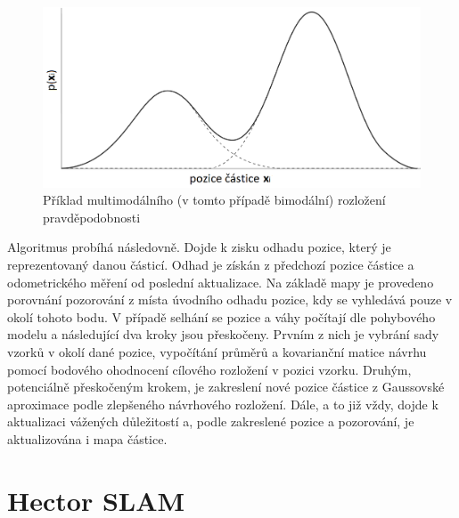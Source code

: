 \documentclass[12pt]{report}
\begin{document}
\begin{figure}[!ht]
	\begin{center}
		\includegraphics[width=0.7\columnwidth]{imgs/multimodal.png}
	\end{center}
	\caption{Příklad multimodálního (v tomto případě bimodální) rozložení pravděpodobnosti}
	\label{fig:multimodal}
\end{figure}

\indent Algoritmus probíhá následovně. Dojde k zisku odhadu pozice, který je reprezentovaný danou částicí. Odhad je získán z předchozí pozice částice a odometrického měření od poslední aktualizace. Na základě mapy je provedeno porovnání pozorování z místa úvodního odhadu pozice, kdy se vyhledává pouze v okolí tohoto bodu. V případě selhání se pozice a váhy počítají dle pohybového modelu a následující dva kroky jsou přeskočeny. Prvním z nich je vybrání sady vzorků v okolí dané pozice, vypočítání průměrů a kovarianční matice návrhu pomocí bodového ohodnocení cílového rozložení v pozici vzorku. Druhým, potenciálně přeskočeným krokem, je zakreslení nové pozice částice z Gaussovské aproximace podle zlepšeného návrhového rozložení. Dále, a to již vždy, dojde k aktualizaci vážených důležitostí a, podle zakreslené pozice a pozorování, je aktualizována i mapa částice. 
 
\newpage

\section{Hector SLAM}
\end{document}

